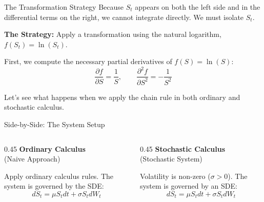 \documentclass{beamer}
\begin{document}
\begin{frame}{The Transformation Strategy}
Because $S_t$ appears on both the left side and in the differential terms on the right, we cannot integrate directly. We must isolate $S_t$.

\vspace{0.3cm}
\textbf{The Strategy:} Apply a transformation using the natural logarithm, $f(S_t) = \ln(S_t)$. 

\vspace{0.3cm}
First, we compute the necessary partial derivatives of $f(S) = \ln(S)$:
\[
\frac{\partial f}{\partial S} = \frac{1}{S}, \qquad \frac{\partial^2 f}{\partial S^2} = -\frac{1}{S^2}
\]

\vspace{0.3cm}
Let's see what happens when we apply the chain rule in both ordinary and stochastic calculus.
\end{frame}

\begin{frame}{Side-by-Side: The System Setup}
\begin{columns}[T]
\begin{column}{0.45\textwidth}
\textbf{Ordinary Calculus} \\
(Naive Approach)
\vspace{0.3cm}

Apply ordinary calculus rules. The system is governed by the SDE:
\[ dS_t = \mu S_t dt + \sigma S_t dW_t \]
\end{column}
\hfill\vrule\hfill
\begin{column}{0.45\textwidth}
\textbf{Stochastic Calculus} \\
(Stochastic System)
\vspace{0.3cm}

Volatility is non-zero ($\sigma > 0$). The system is governed by an SDE:
\[ dS_t = \mu S_t dt + \sigma S_t dW_t \]
\end{column}
\end{columns}
\end{frame}
\end{document}
